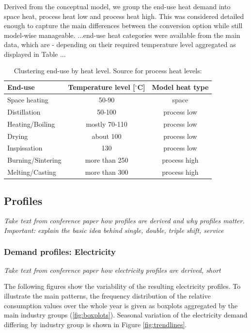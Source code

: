 \documentclass[review]{elsarticle}
\begin{document}
Derived from the conceptual model, we group the end-use heat demand into space heat, process heat low and process heat high. This was considered detailed enough to capture the main differences between the conversion option while still model-wise manageable. ...end-use heat categories were available from the main data, which are - depending on their required temperature level aggregated as displayed in Table ...

\begin{table}
\begin{tabular}{l | c | c}
End-use & Temperature level [$^{\circ}$C] & Model heat type\\
\hline \hline
Space heating & 50-90 & space  \\ 
Distillation & 50-100 & process low \\
Heating/Boiling & mostly 70-110 & process low \\
Drying & about 100 & process low \\
Inspissation & 130 & process low \\ 
Burning/Sintering & more than 250 & process high \\ 
Melting/Casting & more than 300 & process high  
\end{tabular}
\caption{Clustering end-use by heat level. Source for process heat levels: \cite{VM2015}}
\label{tab:temperature_levels} 
\end{table}


\subsection{Profiles}

\textit{Take text from conference paper how profiles are derived and why profiles matter. Important: explain the basic idea behind single, double, triple shift, service}

\subsubsection{Demand profiles: Electricity}

\textit{Take text from conference paper how electricity profiles are derived, short}

The following figures show the variability of the resulting electricity profiles. To illustrate the main patterns, the frequency distribution of the relative consumption values over the whole year is given as boxplots aggregated by the main industry groups (\ref{fig:boxplots}). Seasonal variation of the electricity demand differing by industry group is shown in Figure \ref{fig:trendlines}.
\end{document}
